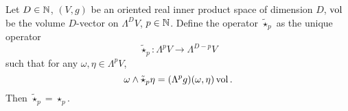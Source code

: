 \begin{proposition}
  Let
    $D \in \mathbb{N}$,
    $(V, g)$ be an oriented real inner product space of dimension $D$,
    $\mathop{\rm vol}\nolimits$ be the volume $D$-vector on $\Lambda^D V$,
    $p \in \mathbb{N}$.
  Define the operator $\tilde{\star}_p$ as the unique operator
  \begin{equation}
    \tilde{\star}_p \colon \Lambda^p V \to \Lambda^{D - p} V
  \end{equation}
  such that for any $\omega, \eta \in \Lambda^p V$,
  \begin{equation}
    \omega \wedge \tilde{\star}_p \eta = (\Lambda^p g)(\omega, \eta) \mathop{\rm vol}\nolimits.
  \end{equation}
  Then $\tilde{\star}_p = \star_p$.
\end{proposition}
